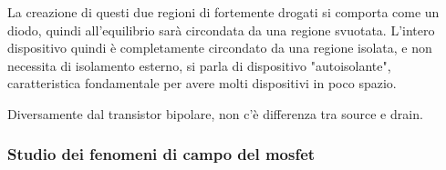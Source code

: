 \documentclass[../template]{subfiles}
\begin{document}
La creazione di questi due regioni di fortemente drogati si comporta come un diodo, quindi all'equilibrio sarà circondata da una regione svuotata.
L'intero dispositivo quindi è completamente circondato da una regione isolata, e non necessita di isolamento esterno, si parla di dispositivo "autoisolante", caratteristica fondamentale per avere molti dispositivi in poco spazio.

Diversamente dal transistor bipolare, non c'è differenza tra source e drain.


\subsubsection{Studio dei fenomeni di campo del mosfet}

\def\xd{3}
\def\tox{2}

\begin{figure}[h]
    \centering
\end{figure}
\end{document}
